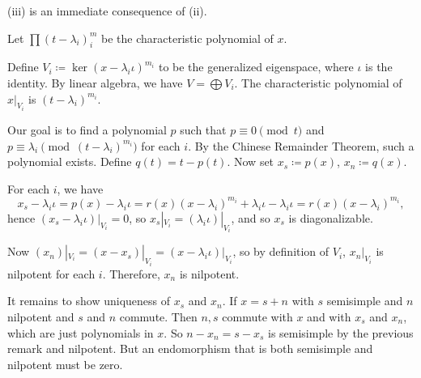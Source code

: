(iii) is an immediate consequence of (ii).

Let $\prod (t - \lambda_i)^m_i$ be the characteristic polynomial of $x$.

Define $V_i\coloneqq \ker(x - \lambda_i\iota)^{m_i}$ to be the generalized
eigenspace, where $\iota$ is the identity. By linear algebra, we have
$V = \bigoplus V_i$.
The characteristic polynomial of $x|_{V_i}$ is $(t - \lambda_i)^{m_i}$.

Our goal is to find a polynomial $p$ such that $p\equiv 0\pmod{t}$ and
$p\equiv \lambda_i\pmod{(t - \lambda_i)^{m_i}}$ for each $i$. By the Chinese
Remainder Theorem, such a polynomial exists. Define $q(t) = t - p(t)$.
Now set $x_s \coloneqq p(x)$, $x_n\coloneqq q(x)$.

For each $i$, we have
\[ x_s - \lambda_i\iota = p(x) - \lambda_i\iota = r(x)(x - \lambda_i)^{m_i} + \lambda_i\iota - \lambda_i\iota = r(x)(x - \lambda_i)^{m_i}, \]
hence $(x_s - \lambda_i\iota)|_{V_i} = 0$, so $x_s|_{V_i} = (\lambda_i\iota)|_{V_i}$,
and so $x_s$ is diagonalizable.

Now $(x_n)|_{V_i} = (x - x_s)|_{V_i} = (x - \lambda_i\iota)|_{V_i}$, so by
definition of $V_i$, $x_n|_{V_i}$ is nilpotent for each $i$. Therefore,
$x_n$ is nilpotent.

It remains to show uniqueness of $x_s$ and $x_n$. If $x = s + n$ with $s$ semisimple
and $n$ nilpotent and $s$ and $n$ commute. Then $n, s$ commute with $x$ and with
$x_s$ and $x_n$, which are just polynomials in $x$. So $n - x_n = s - x_s$ is semisimple
by the previous remark and nilpotent. But an endomorphism that is both semisimple
and nilpotent must be zero.

